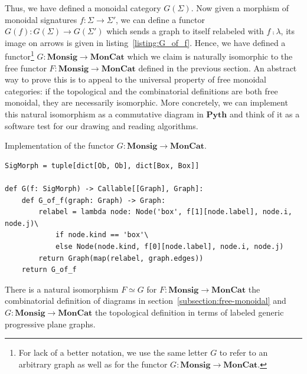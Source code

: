Thus, we have defined a monoidal category $G(\Sigma)$.
Now given a morphism of monoidal signatures $f : \Sigma \to \Sigma'$, we can define a functor $G(f) : G(\Sigma) \to G(\Sigma')$ which sends a graph to itself relabeled with $f \fcmp \lambda$, its image on arrows is given in listing~\ref{listing:G_of_f}.
Hence, we have defined a functor\footnote
{For lack of a better notation, we use the same letter $G$ to refer to an arbitrary graph as well as for the functor $G  : \mathbf{Monsig} \to \mathbf{MonCat}$.} $G : \mathbf{Monsig} \to \mathbf{MonCat}$ which we claim is naturally isomorphic to the free functor $F : \mathbf{Monsig} \to \mathbf{MonCat}$ defined in the previous section.
An abstract way to prove this is to appeal to the universal property of free monoidal categories: if the topological and the combinatorial definitions are both free monoidal, they are necessarily isomorphic.
More concretely, we can implement this natural isomorphism as a commutative diagram in $\mathbf{Pyth}$ and think of it as a software test for our drawing and reading algorithms.
\pagebreak
\begin{python}\label{listing:G_of_f}
{\normalfont Implementation of the functor $G : \mathbf{Monsig} \to \mathbf{MonCat}$.}

\begin{verbatim}
SigMorph = tuple[dict[Ob, Ob], dict[Box, Box]]

def G(f: SigMorph) -> Callable[[Graph], Graph]:
    def G_of_f(graph: Graph) -> Graph:
        relabel = lambda node: Node('box', f[1][node.label], node.i, node.j)\
            if node.kind == 'box'\
            else Node(node.kind, f[0][node.label], node.i, node.j)
        return Graph(map(relabel, graph.edges))
    return G_of_f
\end{verbatim}
\end{python}

\begin{proposition}\label{proposition:nat-iso}
There is a natural isomorphism $F \simeq G$ for $F : \mathbf{Monsig} \to \mathbf{MonCat}$ the combinatorial definition of diagrams in section~\ref{subsection:free-monoidal} and $G : \mathbf{Monsig} \to \mathbf{MonCat}$ the topological definition in terms of labeled generic progressive plane graphs.
\end{proposition}

